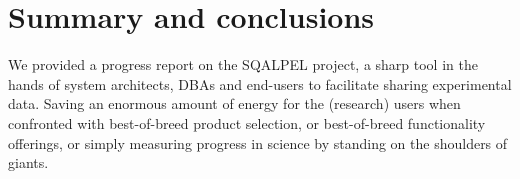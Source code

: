 \documentclass{cidr-2019}
\begin{document}



\section{Summary and conclusions}\label{Summary and conclusions}

We provided a progress report on the {\sc SQALPEL} project, a sharp
tool in the hands of system architects, DBAs and end-users to
facilitate sharing experimental data.
Saving an enormous amount of energy for the (research) users when
confronted with best-of-breed product selection, or best-of-breed
functionality offerings, or simply measuring progress in science by
standing on the shoulders of giants.




\end{document}
